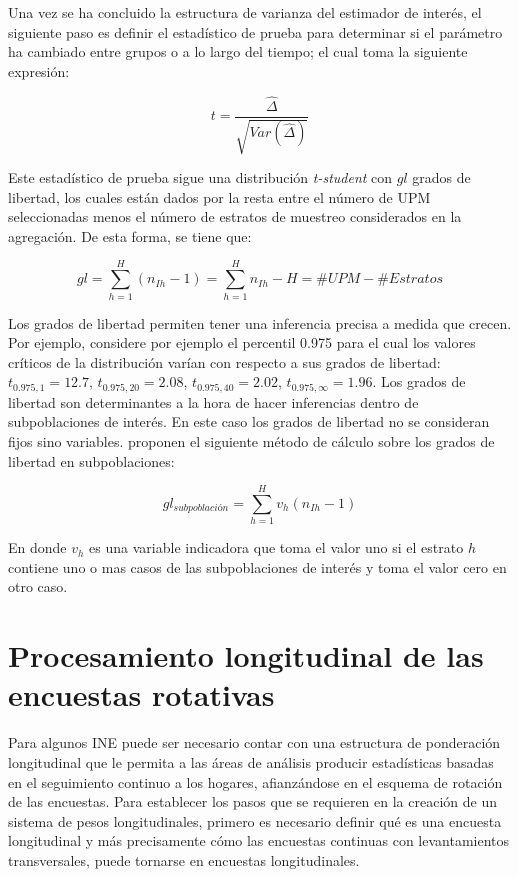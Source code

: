 \documentclass[
  12pt,
  spanish,
]{book}
\begin{document}
Una vez se ha concluido la estructura de varianza del estimador de
interés, el siguiente paso es definir el estadístico de prueba para determinar si el parámetro ha cambiado entre grupos o a lo largo del tiempo; el cual toma la siguiente expresión:

\[
t = \frac{\hat{\Delta}}{\sqrt{Var(\hat{\Delta})}}
\]

Este estadístico de prueba sigue una distribución \emph{t-student} con \(gl\)
grados de libertad, los cuales están dados por la resta entre el número de UPM
seleccionadas menos el número de estratos de muestreo considerados en la agregación. De
esta forma, se tiene que:

\[
gl = \sum_{h=1}^H (n_{Ih} - 1) = \sum_{h=1}^H n_{Ih} - H = \#UPM - \#Estratos
\]

Los grados de libertad permiten tener una inferencia precisa a medida
que crecen. Por ejemplo, considere por ejemplo el percentil 0.975 para
el cual los valores críticos de la distribución varían con respecto a
sus grados de libertad: \(t_{0.975, 1}=12.7\), \(t_{0.975, 20}=2.08\),
\(t_{0.975, 40}=2.02\), \(t_{0.975, \infty}=1.96\). Los grados de libertad
son determinantes a la hora de hacer inferencias dentro de
subpoblaciones de interés. En este caso los grados de libertad no se
consideran fijos sino variables. \citet{Korn_Graubard_1999} proponen el
siguiente método de cálculo sobre los grados de libertad en
subpoblaciones:

\[
gl_{subpoblación} = \sum_{h=1}^H v_h(n_{Ih} - 1)
\]

En donde \(v_h\) es una variable indicadora que toma el valor uno si el
estrato \(h\) contiene uno o mas casos de las subpoblaciones de interés y
toma el valor cero en otro caso.

\hypertarget{procesamiento-longitudinal-de-las-encuestas-rotativas}{%
\chapter{Procesamiento longitudinal de las encuestas rotativas}\label{procesamiento-longitudinal-de-las-encuestas-rotativas}}

Para algunos INE puede ser necesario contar con una estructura de ponderación longitudinal que le permita a las áreas de análisis producir estadísticas basadas en el seguimiento continuo a los hogares, afianzándose en el esquema de rotación de las encuestas. Para establecer los pasos que se requieren en la creación de un sistema de pesos longitudinales, primero es necesario definir qué es una encuesta longitudinal y más precisamente cómo las encuestas continuas con levantamientos transversales, puede tornarse en encuestas longitudinales.
\end{document}
